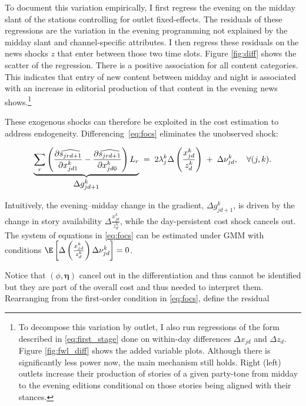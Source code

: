 \documentclass[12pt]{article}
\begin{document}
	
	
	
	To document this variation empirically, I first regress the evening on the midday slant of the stations controlling for outlet fixed-effects. The residuals of these regressions are the  variation in the evening programming not explained by the midday slant and channel-specific attributes. I then regress these residuals on the news shocks $z$ that enter between those two time slots. Figure \ref{fig:diff} shows the scatter of the regression.  There is a positive association for all content categories. This indicates that entry of new content between midday and night is associated with an increase in editorial production of that content in the evening news shows.\footnote{To decompose this variation by outlet, I also run regressions of the form described in  \eqref{eq:first_stage} done on within-day differences $ \Delta x_{jd}$ and $\Delta z_{d}$. Figure \ref{fig:fwl_diff}  shows the added variable plots. Although there is significantly less power now, the main mechanism still holds. Right (left) outlets increase  their production of stories of a given party-tone from midday to the evening editions conditional on those stories being aligned with their stances. 
	} 
	
	
	These exogenous shocks can therefore be exploited in the cost estimation to address endogeneity. Differencing~\eqref{eq:focs} eliminates the unobserved shock:
	
	\begin{equation}\label{eq:diff_foc}
		\underbrace{%
			\sum_{r}\left(
			\frac{\partial \widehat{s_{jrd+1}}}{\partial x_{jd1}^k}
			-
			\frac{\partial \widehat{s_{jrd+1}}}{\partial x_{jd0}^k}
			\right)L_r
		}_{\textstyle \Delta g_{jd+1}^k}
		\;=\;
		2\lambda_j^k
		\Delta	
		\left( \frac{x_{jd}^k }{z_{d}^k } \right)
		\;+\;
		\Delta\nu_{jd}^k,
		\quad \forall (j,k).
	\end{equation}
	
	
	
	Intuitively, the evening–midday change in the gradient, $\Delta g_{jd+1}^k$, is driven by the change in story availability $\Delta	
	\frac{x_{jd}^k }{z_{d}^k }$, while the day-persistent cost shock cancels out. The system of equations in \eqref{eq:focs} can be estimated under GMM with conditions $\E \left[\Delta  \left( \frac{x_{jd}^k}{z_{d}^k} \right)  \Delta\nu_{jd}^k \right]= 0 $. 
	
	
	
	
	Notice that $\left(\phi,\bm\eta \right)$ cancel out in the differentiation and thus cannot be identified but they are part of the overall cost and thus needed to interpret them. Rearranging from the   first-order condition in \eqref{eq:focs}, define the residual
	
\end{document}
